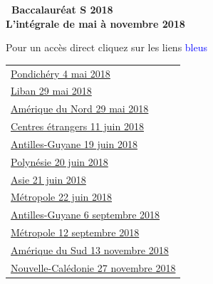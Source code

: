 \documentclass[10pt,a4paper]{article}
\begin{document}
\setlength\parindent{0mm}
\pagestyle{fancy}
\thispagestyle{empty} 
\begin{center}
{\huge\textbf{\decofourleft~Baccalauréat S  
2018~\decofourright\\ \vspace{1cm} L'intégrale de mai à novembre
 2018}}

\vspace{1cm}

Pour un accès direct cliquez sur les liens {\Large 
\textcolor{blue}{bleus}}
\end{center}

\vspace{1cm}
 
\begin{tabularx}{\linewidth}{>{\Large}X} 
\Large \hyperlink{Pondichery}{Pondichéry  4 mai 2018} \dotfill \pageref{Pondichery}\\
\hyperlink{Liban}{Liban  29 mai 2018} \dotfill \pageref{Liban}\\
\hyperlink{AmeriqueNord}{Amérique du Nord 29 mai 2018} \dotfill \pageref{AmeriqueNord}\\
\hyperlink{Centresetrangers}{Centres étrangers 11  juin 2018} \dotfill \pageref{Centresetrangers}\\
\hyperlink{Antilles}{Antilles-Guyane 19 juin 2018} \dotfill \pageref{Antilles}\\
\hyperlink{Polynesie}{Polynésie 20 juin 2018} \dotfill \pageref{Polynesie}\\
\hyperlink{Asie}{Asie 21 juin 2018} \dotfill \pageref{Asie}\\
\hyperlink{Metropole}{Métropole  22 juin 2018} \dotfill \pageref{Metropole}\\
\hyperlink{Antillessep}{Antilles-Guyane  6 septembre 2018} \dotfill \pageref{Antillessep}\\
\hyperlink{Metropolesep}{Métropole  12 septembre 2018} \dotfill \pageref{Metropolesep}\\
\hyperlink{AmeriSud}{Amérique du Sud  13 novembre 2018}\dotfill \pageref{AmeriSud}\\
\hyperlink{Caledonienov}{Nouvelle-Calédonie   27 novembre 2018} \dotfill \pageref{Caledonienov}\\
\end{tabularx}
 
\end{document}
